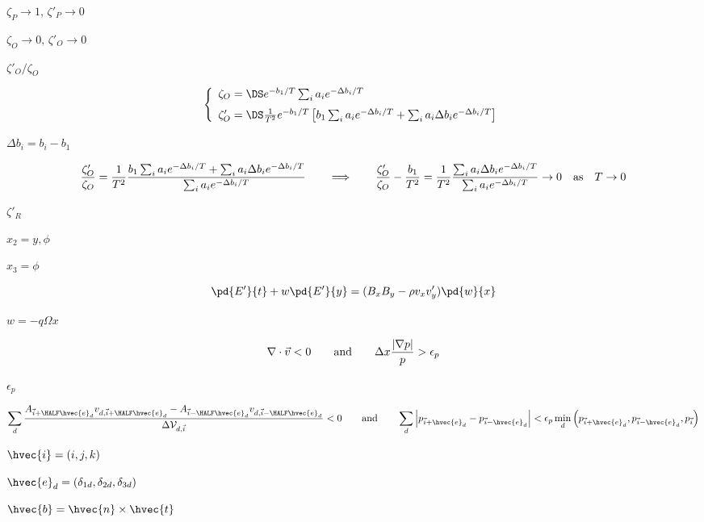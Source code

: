 \documentclass{article}
\begin{document}
$ \zeta_P \to 1,
\, \zeta'_P \to 0$
\pagebreak

$\zeta_O\to 0,\,\zeta'_O\to0$
\pagebreak

$ \zeta'_O/\zeta_O$
\pagebreak

\[
  \left\{\begin{array}{l}
    \zeta_O  = \DS e^{-b_1/T}\sum_i a_ie^{-\Delta b_i/T} \\ \noalign{\medskip}
    \zeta'_O = \DS \frac{1}{T^2}e^{-b_1/T}
                 \left[ b_1 \sum_i a_ie^{-\Delta b_i/T} 
                           +\sum_i a_i\Delta b_ie^{-\Delta b_i/T}\right]
  \end{array}\right.
\]
\pagebreak

$\Delta b_i = b_i-b_1$
\pagebreak

\[
  \frac{\zeta'_O}{\zeta_O} = \frac{1}{T^2}
    \frac{   b_1 \sum_i a_ie^{-\Delta b_i/T} 
          + \sum_i a_i\Delta b_ie^{-\Delta b_i/T}}
         {\sum_i a_ie^{-\Delta b_i/T}}
   \qquad\Longrightarrow\qquad
  \frac{\zeta'_O}{\zeta_O} - \frac{b_1}{T^2}= \frac{1}{T^2}
    \frac{\sum_i a_i\Delta b_ie^{-\Delta b_i/T}}
         {\sum_i a_ie^{-\Delta b_i/T}}  \to 0 \quad{\rm as}\quad T\to 0
\]
\pagebreak

$\zeta'_R$
\pagebreak

$ x_2=y,\phi$
\pagebreak

$ x_3 = \phi$
\pagebreak

\[ 
   \pd{E'}{t} + w\pd{E'}{y} = (B_xB_y - \rho v_xv'_y)\pd{w}{x}
\]
\pagebreak

$w = -q\Omega x$
\pagebreak

\[
   \nabla\cdot\vec{v} < 0 \qquad{\rm and}\qquad
   \Delta x\frac{|\nabla p|}{p} > \epsilon_p
\]
\pagebreak

$\epsilon_p$
\pagebreak

\[
  \sum_d \frac{ A_{\vec{i}+\HALF\hvec{e}_d}v_{d,\vec{i}+\HALF\hvec{e}_d}
               -A_{\vec{i}-\HALF\hvec{e}_d}v_{d,\vec{i}-\HALF\hvec{e}_d} }
              {\Delta{\cal V}_{d,\vec{i}}}  < 0
              \qquad{\rm and}\qquad
  \sum_{d} \left|p_{\vec{i}+\hvec{e}_d} - p_{\vec{i}-\hvec{e}_d}\right|
           <
   \epsilon_p \min_d\left(p_{\vec{i}+\hvec{e}_d},
                          p_{\vec{i}-\hvec{e}_d},p_{\vec{i}}\right)
\]
\pagebreak

$\hvec{i} = (i,j,k)$
\pagebreak

$\hvec{e}_d =
(\delta_{1d},\delta_{2d},\delta_{3d})$
\pagebreak

$ \hvec{b} = \hvec{n} \times \hvec{t} $
\pagebreak
\end{document}
